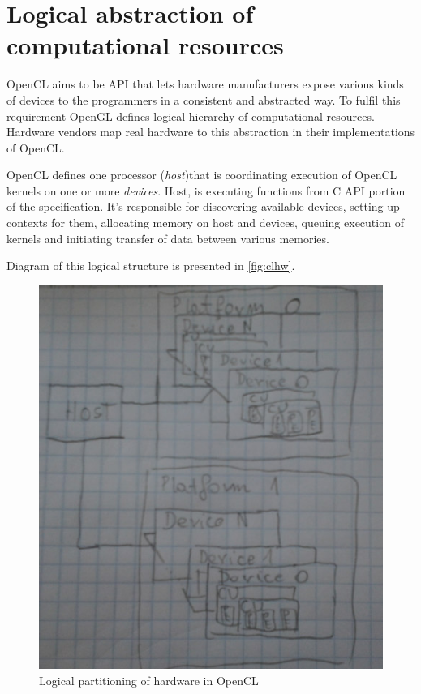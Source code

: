 \section{Logical abstraction of computational resources}

OpenCL aims to be API that lets hardware manufacturers expose various kinds of
devices to the programmers in a consistent and abstracted way. To fulfil this
requirement OpenGL defines logical hierarchy of computational resources.
Hardware vendors map real hardware to this abstraction in their implementations
of OpenCL.

OpenCL defines one processor (\emph{host})that is coordinating execution of
OpenCL kernels on one or more \emph{devices}. Host, is executing functions from
C API portion of the specification. It's responsible for discovering available
devices, setting up contexts for them, allocating memory on host and devices,
queuing execution of kernels and initiating transfer of data between various
memories.

Diagram of this logical structure is presented in \autoref{fig:clhw}.

\begin{figure}[h]
	\begin{center}
		\includegraphics[scale=0.7]{chapters/opencl/opencl_hwmodel.jpg}
	\end{center}
	\caption{Logical partitioning of hardware in OpenCL}
	\label{fig:clhw}
\end{figure}

